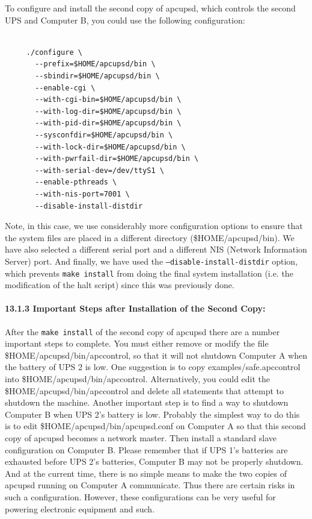\label{index-Two-apcupsds-161}
To configure and install the second copy of apcupsd, which controls the second
UPS and Computer B, you could use the following configuration: 

\footnotesize
\begin{verbatim}
     
     ./configure \
       --prefix=$HOME/apcupsd/bin \
       --sbindir=$HOME/apcupsd/bin \
       --enable-cgi \
       --with-cgi-bin=$HOME/apcupsd/bin \
       --with-log-dir=$HOME/apcupsd/bin \
       --with-pid-dir=$HOME/apcupsd/bin \
       --sysconfdir=$HOME/apcupsd/bin \
       --with-lock-dir=$HOME/apcupsd/bin \
       --with-pwrfail-dir=$HOME/apcupsd/bin \
       --with-serial-dev=/dev/ttyS1 \
       --enable-pthreads \
       --with-nis-port=7001 \
       --disable-install-distdir
\end{verbatim}
\normalsize

Note, in this case, we use considerably more configuration options to ensure
that the system files are placed in a different directory
(\$HOME/apcupsd/bin). We have also selected a different serial port and a
different NIS (Network Information Server) port. And finally, we have used the
{\tt --disable-install-distdir} option, which prevents {\tt make install} from
doing the final system installation (i.e. the modification of the halt script)
since this was previously done. 

\label{Important-Steps-after-Installation-of-the-Second-Copy}

\paragraph*{13.1.3 Important Steps after Installation of the Second Copy:}

After the {\tt make install} of the second copy of apcupsd there are a number
important steps to complete. You must either remove or modify the file
\$HOME/apcupsd/bin/apccontrol, so that it will not shutdown Computer A when
the battery of UPS 2 is low. One suggestion is to copy
examples/safe.apccontrol into \$HOME/apcupsd/bin/apccontrol. Alternatively,
you could edit the \$HOME/apcupsd/bin/apccontrol and delete all statements
that attempt to shutdown the machine. Another important step is to find a way
to shutdown Computer B when UPS 2's battery is low.  Probably the simplest way
to do this is to edit \$HOME/apcupsd/bin/apcupsd.conf on Computer A so that
this second copy of apcupsd becomes a network master. Then install a standard
slave configuration on Computer B. Please remember that if UPS 1's batteries
are exhausted before UPS 2's batteries, Computer B may not be properly
shutdown. And at the current time, there is no simple means to make the two
copies of apcupsd running on Computer A communicate. Thus there are certain
risks in such a configuration. However, these configurations can be very
useful for powering electronic equipment and such.  

